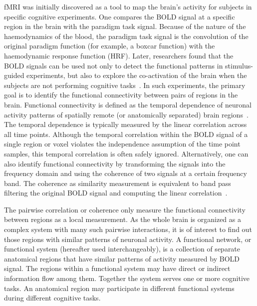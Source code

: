 fMRI was initially discovered as a tool to map the brain's activity for subjects
in specific cognitive experiments. One compares the BOLD signal at a specific
region in the brain with the paradigm task signal. Because of the nature of the
haemodynamics of the blood, the paradigm task signal is the convolution of the
original paradigm function (for example, a boxcar function) with the
haemodynamic response function (HRF). Later, researchers found that the BOLD
signals can be used not only to detect the functional patterns in
stimulus-guided experiments, but also to explore the co-activation of the brain
when the subjects are not performing cognitive
tasks~\cite{biswal1995functional}. In such experiments, the primary goal is to
identify the functional connectivity between pairs of regions in the
brain. Functional connectivity is defined as the temporal dependence of neuronal
activity patterns of spatially remote (or anatomically separated) brain
regions~\cite{friston1994functional, worsley_analysis_1995,
  friston1994analysis}. The temporal dependence is typically measured by the
linear correlation across all time points. Although the temporal correlation
within the BOLD signal of a single region or voxel violates the independence
assumption of the time point samples, this temporal correlation is often safely
ignored. Alternatively, one can also identify functional connectivity by
transforming the signals into the frequency domain and using the coherence of
two signals at a certain frequency band. The coherence as similarity measurement
is equivalent to band pass filtering the original BOLD signal and computing the
linear correlation~\cite{cordes2000mapping, cordes2001frequencies}.

The pairwise correlation or coherence only measure the functional connectivity
between regions as a local measurement. As the whole brain is organized as a
complex system with many such pairwise interactions, it is of interest to find
out those regions with similar patterns of neuronal activity. A functional
network, or functional system (hereafter used interchangeably), is a collection
of separate anatomical regions that have similar patterns of activity measured
by BOLD signal. The regions within a functional system may have direct or
indirect information flow among them. Together the system serves one or more
cognitive tasks. An anatomical region may participate in different functional
systems during different cognitive tasks.

